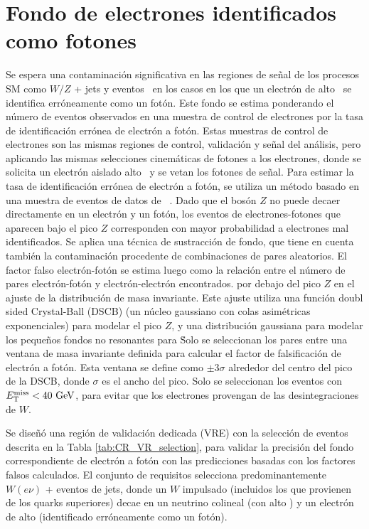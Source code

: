 \section{Fondo de electrones identificados como fotones}


Se espera una contaminación significativa en las regiones de señal de los procesos SM como $W/Z$ + jets y eventos \ttbar\ en los casos en los que un electrón de alto \pt\ se identifica erróneamente como un fotón.
Este fondo se estima ponderando el número de eventos observados en una muestra de control de electrones por la tasa de identificación errónea de electrón a fotón.
Estas muestras de control de electrones son las mismas regiones de control, validación y señal del análisis, pero aplicando las mismas selecciones cinemáticas de fotones a los electrones, donde se solicita un electrón aislado alto \pt\ y se vetan los fotones de señal.
Para estimar la tasa de identificación errónea de electrón a fotón, se utiliza un método basado en una muestra de eventos de datos de \zee\ \cite{ATLASCollaboration:2016wlb}. Dado que el bosón $Z$ no puede decaer directamente en un electrón y un fotón, los eventos de electrones-fotones que aparecen bajo el pico $Z$ corresponden con mayor probabilidad a
electrones mal identificados. Se aplica una técnica de sustracción de fondo, que tiene en cuenta también la
contaminación procedente de combinaciones de pares aleatorios. El factor falso electrón-fotón se estima luego como la relación entre el número de pares electrón-fotón y electrón-electrón encontrados.
por debajo del pico $Z$ en el ajuste de la distribución de masa invariante.
Este ajuste utiliza una función doubl sided Crystal-Ball (DSCB) (un núcleo gaussiano con colas asimétricas exponenciales) para modelar el pico $Z$, y una distribución gaussiana para modelar los pequeños fondos no resonantes para \zee\.
Solo se seleccionan los pares entre una ventana de masa invariante definida para calcular el factor de falsificación de electrón a fotón. Esta ventana se define como $\pm 3 \sigma$ alrededor del centro del pico de la DSCB, donde $\sigma$ es el ancho del pico.
Solo se seleccionan los eventos con $E_{\text{T}}^{\text{miss}}<40\ \text{GeV} $,
para evitar que los electrones provengan de las desintegraciones de $W$.

Se diseñó una región de validación dedicada (VRE) con la selección de eventos descrita en la Tabla
\ref{tab:CR_VR_selection}, para validar la precisión del fondo correspondiente de electrón a fotón
con las predicciones basadas con los factores falsos calculados. El conjunto de requisitos selecciona
predominantemente $W(e \nu)$ + eventos de jets, donde un $W$ impulsado (incluidos los que provienen de los quarks superiores) decae en un
neutrino colineal (con alto \met) y un electrón de alto \pt  (identificado erróneamente como un
fotón).

